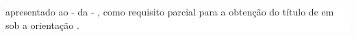 \begin{center}
	\colorbox{white}{\begin{minipage}[t][5cm][t]{\textwidth-1.2cm}
			\begin{flushright}
				\begin{minipage}{7cm}
					\fontsize{12pt}{12pt}\selectfont
					{\denominacaoExtensaTrabalhoTRAB } apresentado ao { \campusInstituicaoTRAB } - {\siglaCampusInstituicaoTRAB } da { \instituicaoTRAB } - { \siglaInstituicaoTRAB}, como requisito parcial para a obtenção do título de { \grauFormacaoTRAB } em { \cursoTRAB } sob a orientação { \preposicaoOrientadorTRAB } { \titulcaoOrientadorTRAB } {\nomeOrientadorTRAB}.
				\end{minipage}
			\end{flushright}
	\end{minipage}}
	\vspace*{-\baselineskip}

	\vspace*{\fill}

	\noindent{}
\vspace*{-\baselineskip}
\end{center}
\clearpage
\thispagestyle{empty}
\newpage


%	
%	
%	
%	
%	
%	
%	
%
%	
%	
%	

